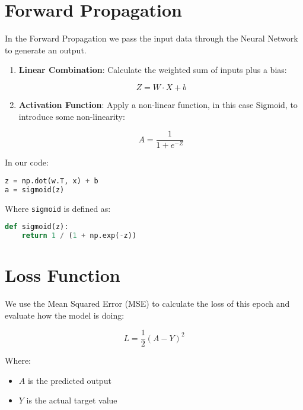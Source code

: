 \documentclass{article}
\begin{document}
\section{Forward Propagation}

In the Forward Propagation we pass the input data through the Neural Network to generate an output.

\begin{enumerate}
    \item \textbf{Linear Combination}: Calculate the weighted sum of inputs plus a bias:

    \begin{equation}
        Z = W \cdot X + b
    \end{equation}

    \item \textbf{Activation Function}: Apply a non-linear function, in this case Sigmoid, to introduce some non-linearity:

    \begin{equation}
        A = \frac{1}{1 + e^{-Z}}
    \end{equation}
\end{enumerate}

In our code:

\begin{lstlisting}[language=Python]
z = np.dot(w.T, x) + b
a = sigmoid(z)
\end{lstlisting}

Where \texttt{sigmoid} is defined as:

\begin{lstlisting}[language=Python]
def sigmoid(z):
    return 1 / (1 + np.exp(-z))
\end{lstlisting}

\section{Loss Function}

We use the Mean Squared Error (MSE) to calculate the loss of this epoch and evaluate how the model is doing:

\begin{equation}
    L = \frac{1}{2}(A - Y)^2
\end{equation}

Where:
\begin{itemize}
    \item $A$ is the predicted output
    \item $Y$ is the actual target value
\end{itemize}
\end{document}
